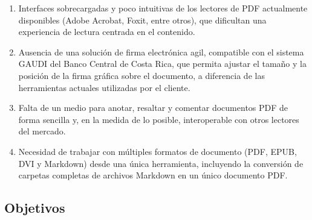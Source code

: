 \begin{enumerate}
	\item Interfaces sobrecargadas y poco intuitivas de los lectores de PDF actualmente disponibles (Adobe Acrobat, Foxit, entre otros), que dificultan una experiencia de lectura centrada en el contenido.
	\item Ausencia de una solución de firma electrónica agil, compatible con el sistema GAUDI del Banco Central de Costa Rica, que permita ajustar el tamaño y la posición de la firma gráfica sobre el documento, a diferencia de las herramientas actuales utilizadas por el cliente.
	\item Falta de un medio para anotar, resaltar y comentar documentos PDF de forma sencilla y, en la medida de lo posible, interoperable con otros lectores del mercado.
	\item Necesidad de trabajar con múltiples formatos de documento (PDF, EPUB, DVI y Markdown) desde una única herramienta, incluyendo la conversión de carpetas completas de archivos Markdown en un único documento PDF.
\end{enumerate}

\subsection{Objetivos}

%







